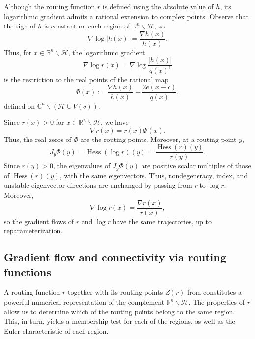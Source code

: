 \documentclass[11pt]{article}
\numberwithin{equation}{section}
\theoremstyle{plain}
\theoremstyle{definition}
\theoremstyle{remark}
\newcommand{\sH}{{\mathcal H}}
\newcommand\bC{{\mathbb C}}
\newcommand\bR{{\mathbb R}}
\DeclareMathOperator*{\Hess}{Hess}
\begin{document}
Although the routing function $r$ is defined using the absolute value  of $h$, its logarithmic gradient admits a rational extension to complex points. Observe that the sign of $h$ is constant on each region of $\bR^{n}\smallsetminus \sH$, so 
\begin{equation*}
\nabla \log \lvert h(x)\rvert = \frac{\nabla h(x)}{h(x)}.     
\end{equation*}
Thus, for $x\in \bR^{n}\smallsetminus \sH$, the logarithmic gradient
\begin{equation*}
    \nabla \log r(x) = \nabla \log \frac{\lvert h(x)\rvert}{q(x)^{e}}
\end{equation*}
is the restriction to the real points of the rational map 
\begin{equation}\label{eq:Phi}
\Phi(x) := \frac{\nabla h(x)}{h(x)} - \frac{2e(x-c)}{q(x)},    
\end{equation}
defined on $\bC^{n}\smallsetminus(\sH \cup V(q))$. 

Since $r(x) > 0$ for $x\in \bR^{n}\smallsetminus \sH$, we have 
\begin{equation*}
\nabla r(x) = r(x)\Phi(x). 
\end{equation*}
Thus, the real zeros of $\Phi$ are the routing points. Moreover, at a routing point $y$,
\begin{equation*}
    J_{y}\Phi(y) = \Hess(\log r)(y) = \frac{\Hess(r)(y)}{r(y)}.
\end{equation*}
Since $r(y) > 0$, the eigenvalues of $J_{y}\Phi(y)$ are positive scalar multiples of those of $\Hess(r)(y)$, with the same eigenvectors. Thus, nondegeneracy, index, and unstable eigenvector directions are unchanged by passing from $r$ to $\log r$. Moreover, 
\begin{equation*}
    \nabla \log r(x) = \frac{\nabla r(x)}{r(x)}, 
\end{equation*}
so the gradient flows of $r$ and $\log r$ have the same trajectories, up to reparameterization.

\subsection{Gradient flow and connectivity via routing functions}\label{subsec:RoutingConnectivity}
A routing function $r$ together with its routing points $Z(r)$ from  constitutes a powerful numerical representation of the complement $\bR^{n}\smallsetminus \sH$. The properties of $r$ allow us to determine which of the routing points belong to the same region. This, in turn, yields a membership test for each of the regions, as well as the Euler characteristic of each region.
\end{document}
